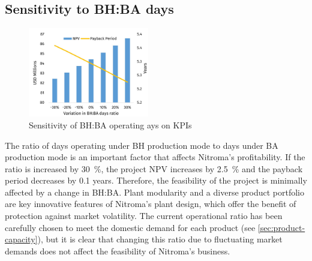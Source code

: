 \subsection{Sensitivity to BH:BA days}
\label{sec:sensitivity-ratiodays}
\begin{figure}
    \vspace{-0.9cm}
    \caption{Sensitivity of BH:BA operating ays on KPIs}
    \label{Sensitivity_BHBA}
    \includegraphics[width=0.47\textwidth]{chapters/6-economics/figures/Sensitivity_OperatingDays.jpg}
\end{figure}
The ratio of days operating under BH production mode to days under BA production mode is an important factor that affects Nitroma’s profitability. If the ratio is increased by \SI{30}{\percent}, the project NPV increases by \SI{2.5}{\percent} and the payback period decreases by 0.1 years. Therefore, the feasibility of the project is minimally affected by a change in BH:BA. Plant modularity and a diverse product portfolio are key innovative features of Nitroma’s plant design, which offer the benefit of protection against market volatility. The current operational ratio has been carefully chosen to meet the domestic demand for each product (see \cref{sec:product-capacity}), but it is clear that changing this ratio due to fluctuating market demands does not affect the feasibility of Nitroma’s business.